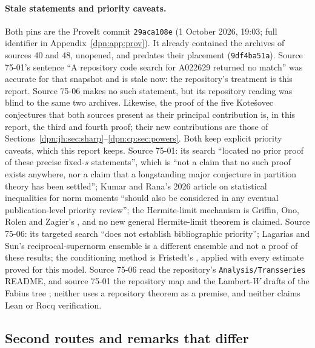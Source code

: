 \documentclass[11pt]{article}
\numberwithin{equation}{section}
\theoremstyle{definition}\newtheorem{definition}[theorem]{Definition}
\theoremstyle{remark}\newtheorem{remark}[theorem]{Remark}
\newcommand{\file}[1]{\nolinkurl{#1}}
\begin{document}
\paragraph{Stale statements and priority caveats.}
Both pins are the ProveIt commit \texttt{29aca108e} (1 October 2026, 19:03;
full identifier in Appendix~\ref{dpn:app:prov}).
It already contained the archives of sources 40 and 48, unopened, and predates
their placement (\texttt{9df4ba51a}).  Source 75-01's sentence ``A repository
code search for A022629 returned no match'' was accurate for that snapshot and
is stale now: the repository's treatment is this report.  Source 75-06 makes
no such statement, but its repository reading was blind to the same two
archives.  Likewise, the proof
of the five Kote\v{s}ovec conjectures that both sources present as their
principal contribution is, in this report, the third and fourth proof; their
new contributions are those of Sections~\ref{dpn:jh:sec:sharp}--\ref{dpn:cp:sec:powers}.
Both keep explicit priority caveats, which this report keeps.  Source 75-01:
its search ``located no prior proof of these precise fixed-$s$ statements'',
which is ``not a claim that no such proof exists anywhere, nor a claim that a
longstanding major conjecture in partition theory has been settled''; Kumar
and Rana's 2026 article on statistical inequalities for norm moments
\cite{kumar} ``should also be considered in any eventual publication-level
priority review''; the Hermite-limit mechanism is Griffin, Ono, Rolen and
Zagier's \cite{gorz}, and no new general Hermite-limit theorem is claimed.
Source 75-06: its targeted search ``does not establish bibliographic
priority''; Lagarias and Sun's reciprocal-supernorm ensemble \cite{lagarias}
is a different ensemble and not a proof of these results; the conditioning
method is Fristedt's \cite{fristedt}, applied with every estimate proved for
this model.  Source 75-06 read the repository's \file{Analysis/Transseries}
README, and source 75-01 the repository map and the Lambert-$W$ drafts of the
Fabius tree \cite{proveit01}; neither uses a repository theorem as a premise, and neither
claims Lean or Rocq verification.

\subsection{Second routes and remarks that differ}\label{dpn:sec:b75routes}
\end{document}
